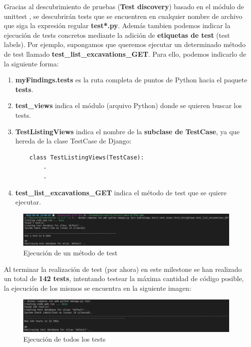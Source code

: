 Gracias al descubrimiento de pruebas (\textbf{Test discovery}) basado en el módulo de
unittest \cite{test-discovery}, se descubrirán tests que se encuentren en cualquier nombre
de archivo que siga la expresión regular \textbf{test*.py}. Además tambien podemos indicar
la ejecución de tests concretos mediante la adición de \textbf{etiquetas de test} (test
labels). Por ejemplo, supongamos que queremos ejecutar un determinado método de test
llamado \textbf{test\_list\_excavations\_GET}. Para ello, podemos indicarlo de la siguiente
forma:

    \begin{enumerate}
        \item \textbf{myFindings.tests} es la ruta completa de puntos de Python hacia el
        paquete \textbf{tests}.
        \item \textbf{test\_views} indica el módulo (arquivo Python) donde se quieren
        buscar los tests.
        \item \textbf{TestListingViews} indica el nombre de la \textbf{subclase de TestCase},
        ya que hereda de la clase TestCase de Django:
    \begin{verbatim}
    class TestListingViews(TestCase):
        .
        .
    \end{verbatim}
        \item \textbf{test\_list\_excavations\_GET} indica el método de test que se quiere
        ejecutar.
    \end{enumerate}

    \begin{figure}[H]
        \centering
        \includegraphics[scale=0.27]{imagenes/one-test.png}
        \caption{Ejecución de un método de test}
        \label{fig:one-test}
    \end{figure}

Al terminar la realización de test (por ahora) en este milestone se han realizado un total de
\textbf{142 tests}, intentando testear la máxima cantidad de código posible, la ejecución de
los mismos se encuentra en la siguiente imagen:

    \begin{figure}[H]
        \centering
        \includegraphics[scale=0.30]{imagenes/all-tests.png}
        \caption{Ejecución de todos los tests}
        \label{fig:all-tests}
    \end{figure}
